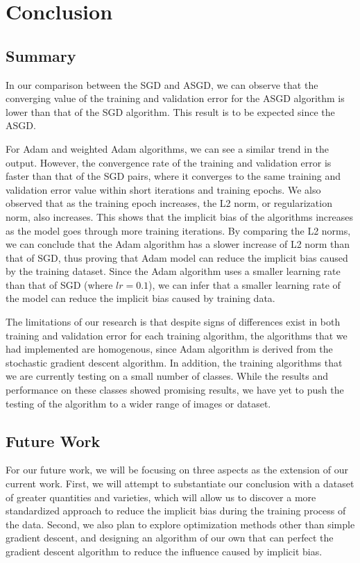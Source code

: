 \chapter{Conclusion}

\section{Summary}
In our comparison between the SGD and ASGD, we can observe that the converging value of the training and validation error for the ASGD algorithm is lower than that of the SGD algorithm. This result is to be expected since the ASGD.

For Adam and weighted Adam algorithms, we can see a similar trend in the output. However, the convergence rate of the training and validation error is faster than that of the SGD pairs, where it converges to the same training and validation error value within short iterations and training epochs. We also observed that as the training epoch increases, the L2 norm, or regularization norm, also increases. This shows that the implicit bias of the algorithms increases as the model goes through more training iterations. By comparing the L2 norms, we can conclude that the Adam algorithm has a slower increase of L2 norm than that of SGD, thus proving that Adam model can reduce the implicit bias caused by the training dataset. Since the Adam algorithm uses a smaller learning rate than that of SGD (where $lr = 0.1$), we can infer that a smaller learning rate of the model can reduce the implicit bias caused by training data.

The limitations of our research is that despite signs of differences exist in both training and validation error for each training algorithm, the algorithms that we had implemented are homogenous, since Adam algorithm is derived from the stochastic gradient descent algorithm. In addition, the training algorithms that we are currently testing on a small number of classes. While the results and performance on these classes showed promising results, we have yet to push the testing of the algorithm to a wider range of images or dataset.

\section{Future Work}
For our future work, we will be focusing on three aspects as the extension of our current work. First, we will attempt to substantiate our conclusion with a dataset of greater quantities and varieties, which will allow us to discover a more standardized approach to reduce the implicit bias during the training process of the data. Second, we also plan to explore optimization methods other than simple gradient descent, and designing an algorithm of our own that can perfect the gradient descent algorithm to reduce the influence caused by implicit bias. 

